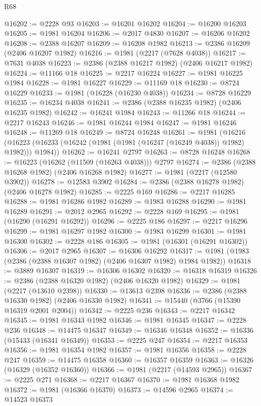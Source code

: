 \begin{lexlean}{R68}
\begin{coremodule}
@16202 := @2228 @93
@16203 := @16201 @16202
@16204 := @16200 @16203
@16205 := @1981 @16204
@16206 := @2017 @4830
@16207 := @16206 @16202
@16208 := @2388 @16207
@16209 := @16208 @1982
@16213 := @2386 @16209 (@2406 @16207 @1982)
@16216 := @1981 (@2217 (@7628 @4038))
@16217 := @7631 @4038
@16223 := @2386 (@2388 @16217 @1982) (@2406 @16217 @1982)
@16224 := @11166 @18
@16225 := @2217 @16224
@16227 := @1981 @16225 @1984
@16228 := @1981 @16227
@16229 := @11169 @18
@16230 := @8724 @16229
@16233 := @1981 (@16228 (@16230 @4038))
@16234 := @8728 @16229
@16235 := @16234 @4038
@16241 := @2386 (@2388 @16235 @1982) (@2406 @16235 @1982)
@16242 := @16241 @1984
@16243 := @11266 @18
@16244 := @2217 @16243
@16246 := @1981 @16244 @1984
@16247 := @1981 @16246
@16248 := @11269 @18
@16249 := @8724 @16248
@16261 := @1981
    (@16216 (@16223 (@16233 (@16242 (@1981 (@1981 (@16247 (@16249 @4038)) @1982) @1982))) @1984))
@16262 := @16241 @2797
@16263 := @8728 @16248
@16268 := @16223 (@16262 (@11509 (@16263 @4038))) @2797
@16274 := @2386 (@2388 @16268 @1982) (@2406 @16268 @1982)
@16277 := @1981 (@2217 (@12580 @3902))
@16278 := @12583 @3902
@16284 := @2386 (@2388 @16278 @1982) (@2406 @16278 @1982)
@16285 := @2225 @169
@16286 := @2217 @16285
@16288 := @1981 @16286 @1982
@16289 := @1983 @16288
@16290 := @1981 @16289
@16291 := @2012 @2965
@16292 := @2228 @169
@16295 := @1981 (@16290 (@16291 @16292))
@16296 := @2225 @186
@16297 := @2217 @16296
@16299 := @1981 @16297 @1982
@16300 := @1983 @16299
@16301 := @1981 @16300
@16302 := @2228 @186
@16305 := @1981 (@16301 (@16291 @16302))
@16306 := @2017 @2965
@16307 := @16306 @16292
@16317 := @1981 (@1983 (@2386 (@2388 @16307 @1982) (@2406 @16307 @1982) @1984 @1982))
@16318 := @3889 @16307
@16319 := @16306 @16302
@16320 := @16318 @16319
@16326 := @2386 (@2388 @16320 @1982) (@2406 @16320 @1982)
@16329 := @1981 (@2217 (@13610 @2398))
@16330 := @13613 @2398
@16336 := @2386 (@2388 @16330 @1982) (@2406 @16330 @1982)
@16341 := @15440 (@3766 (@15390 @16319 @2001 @2004))
@16342 := @2225 @236
@16343 := @2217 @16342
@16345 := @1981 @16343 @1982
@16346 := @1981 @16345
@16347 := @2228 @236
@16348 := @14475 @16347
@16349 := @16346 @16348
@16352 := @16336 (@15433 (@16341 @16349))
@16353 := @2225 @247
@16354 := @2217 @16353
@16356 := @1981 @16354 @1982
@16357 := @1981 @16356
@16358 := @2228 @247
@16359 := @14475 @16358
@16360 := @16357 @16359
@16363 := @16326 (@16329 (@16352 @16360))
@16366 := @1981 (@2217 (@14593 @2965))
@16367 := @2225 @271
@16368 := @2217 @16367
@16370 := @1981 @16368 @1982
@16372 := @1981 (@16366 @16370)
@16373 := @14596 @2965
@16374 := @14523 @16373

\end{coremodule}
\end{lexlean}
